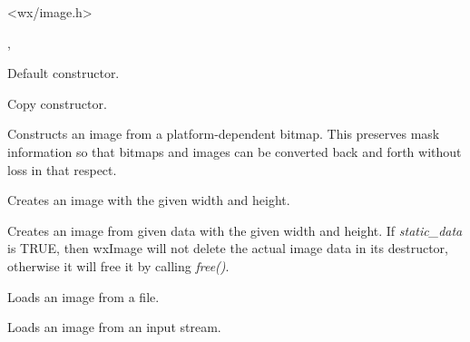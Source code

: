 


<wx/image.h>


, 


\label{wximageconstr}


Default constructor.


Copy constructor.


Constructs an image from a platform-dependent bitmap. This preserves
mask information so that bitmaps and images can be converted back
and forth without loss in that respect.


Creates an image with the given width and height.


Creates an image from given data with the given width and height. If 
{\it static_data} is TRUE, then wxImage will not delete the actual
image data in its destructor, otherwise it will free it by calling
{\it free()}.



Loads an image from a file.



Loads an image from an input stream.



